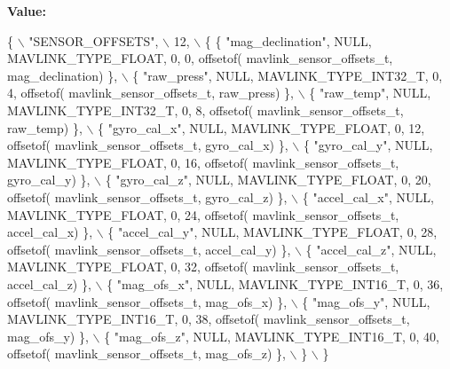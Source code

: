 {\bfseries Value\+:}
\begin{DoxyCode}
\{ \(\backslash\)
    \textcolor{stringliteral}{"SENSOR\_OFFSETS"}, \(\backslash\)
    12, \(\backslash\)
    \{  \{ \textcolor{stringliteral}{"mag\_declination"}, NULL, MAVLINK_TYPE_FLOAT, 0, 0, offsetof(
      mavlink_sensor_offsets_t, mag\_declination) \}, \(\backslash\)
         \{ \textcolor{stringliteral}{"raw\_press"}, NULL, MAVLINK_TYPE_INT32_T, 0, 4, offsetof(
      mavlink_sensor_offsets_t, raw\_press) \}, \(\backslash\)
         \{ \textcolor{stringliteral}{"raw\_temp"}, NULL, MAVLINK_TYPE_INT32_T, 0, 8, offsetof(
      mavlink_sensor_offsets_t, raw\_temp) \}, \(\backslash\)
         \{ \textcolor{stringliteral}{"gyro\_cal\_x"}, NULL, MAVLINK_TYPE_FLOAT, 0, 12, offsetof(
      mavlink_sensor_offsets_t, gyro\_cal\_x) \}, \(\backslash\)
         \{ \textcolor{stringliteral}{"gyro\_cal\_y"}, NULL, MAVLINK_TYPE_FLOAT, 0, 16, offsetof(
      mavlink_sensor_offsets_t, gyro\_cal\_y) \}, \(\backslash\)
         \{ \textcolor{stringliteral}{"gyro\_cal\_z"}, NULL, MAVLINK_TYPE_FLOAT, 0, 20, offsetof(
      mavlink_sensor_offsets_t, gyro\_cal\_z) \}, \(\backslash\)
         \{ \textcolor{stringliteral}{"accel\_cal\_x"}, NULL, MAVLINK_TYPE_FLOAT, 0, 24, offsetof(
      mavlink_sensor_offsets_t, accel\_cal\_x) \}, \(\backslash\)
         \{ \textcolor{stringliteral}{"accel\_cal\_y"}, NULL, MAVLINK_TYPE_FLOAT, 0, 28, offsetof(
      mavlink_sensor_offsets_t, accel\_cal\_y) \}, \(\backslash\)
         \{ \textcolor{stringliteral}{"accel\_cal\_z"}, NULL, MAVLINK_TYPE_FLOAT, 0, 32, offsetof(
      mavlink_sensor_offsets_t, accel\_cal\_z) \}, \(\backslash\)
         \{ \textcolor{stringliteral}{"mag\_ofs\_x"}, NULL, MAVLINK_TYPE_INT16_T, 0, 36, offsetof(
      mavlink_sensor_offsets_t, mag\_ofs\_x) \}, \(\backslash\)
         \{ \textcolor{stringliteral}{"mag\_ofs\_y"}, NULL, MAVLINK_TYPE_INT16_T, 0, 38, offsetof(
      mavlink_sensor_offsets_t, mag\_ofs\_y) \}, \(\backslash\)
         \{ \textcolor{stringliteral}{"mag\_ofs\_z"}, NULL, MAVLINK_TYPE_INT16_T, 0, 40, offsetof(
      mavlink_sensor_offsets_t, mag\_ofs\_z) \}, \(\backslash\)
         \} \(\backslash\)
\}
\end{DoxyCode}
\mbox{\label{mavlink__msg__sensor__offsets_8h_ae81e3851bc0e0cc0378c5d152b305454}} 
